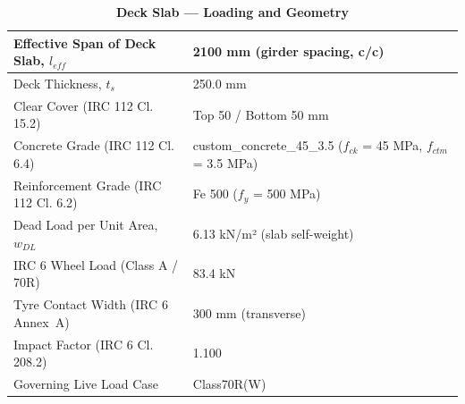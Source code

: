 \documentclass[12pt,a4paper]{report}
\numberwithin{table}{chapter}
\numberwithin{figure}{chapter}
\begin{document}
\vspace{1em}
\begin{longtable}{|L{5.5cm}|p{10.0cm}|}
\caption{\textbf{Deck Slab --- Loading and Geometry}}
\hline
\textnormal{Effective Span of Deck Slab, $l_{eff}$} & 2100 mm (girder spacing, c/c) \\[6pt]
\hline
\textnormal{Deck Thickness, $t_s$} & 250.0 mm \\[6pt]
\hline
\textnormal{Clear Cover (IRC 112 Cl. 15.2)} & Top 50 / Bottom 50 mm \\[6pt]
\hline
\textnormal{Concrete Grade (IRC 112 Cl. 6.4)} & custom\_\allowbreak{}concrete\_\allowbreak{}45\_\allowbreak{}3.5 ($f_{ck}$ = 45 MPa, $f_{ctm}$ = 3.5 MPa) \\[6pt]
\hline
\textnormal{Reinforcement Grade (IRC 112 Cl. 6.2)} & Fe 500 ($f_y$ = 500 MPa) \\[6pt]
\hline
\textnormal{Dead Load per Unit Area, $w_{DL}$} & 6.13 kN/m² (slab self-weight) \\[6pt]
\hline
\textnormal{IRC 6 Wheel Load (Class A / 70R)} & 83.4 kN \\[6pt]
\hline
\textnormal{Tyre Contact Width (IRC 6 Annex~A)} & 300 mm (transverse) \\[6pt]
\hline
\textnormal{Impact Factor (IRC 6 Cl. 208.2)} & 1.100 \\[6pt]
\hline
\textnormal{Governing Live Load Case} & Class70R(W) \\[6pt]
\hline
\end{longtable}
\end{document}
